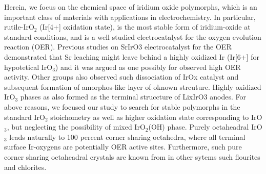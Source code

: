 




Herein, we focus on the chemical space of iridium oxide polymorphs,
which is an important class of materials with applications in electrochemistry. In particular, rutile-IrO$_2$ (Ir[4+] oxidation state), is the most stable form of iridium-oxide at standard conditions, and is a well studied electrocatalyst for the oxygen evolution reaction (OER).\cite{like 5 papers here pls}
Previous studies on SrIrO3 electrocatalyst for the OER demonstrated that Sr leaching might leave behind a highly oxidized Ir (Ir[6+] for hypotetical IrO$_3$) and it was argued as one possibly for observed high OER activity.\cite{Dickens} Other groups also observed such dissociation of IrOx catalyst and subsequent formation of amorphos-like layer of oknown strcuture\cite{Schlogl, beta-IrO3 OER paper}. Highly oxidized IrO$_3$ phases as also formed as the terminal struccture of LixIrO3 anodes.\cite{betaIrO3}
For above reasons, we focused our study to search for stable polymorphs in the standard IrO$_2$ stoichometry as well as higher oxidation state corresponding to IrO$_3$, but neglecting the possibility of mixed IrO$_2$(OH) phase.
Purely octaheadral IrO$_3$ leads naturally  to 100 percent corner sharing octahedra, where all terminal surface Ir-oxygens are potentially OER active sites. Furthermore, such pure corner sharing octaheadral crystals are known from in other sytems such flourites and chlorites. 

